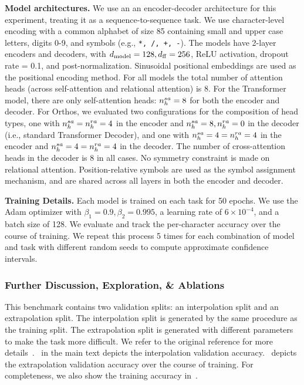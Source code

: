 \textbf{Model architectures.} We use an an encoder-decoder architecture for this experiment, treating it as a sequence-to-sequence task. We use character-level encoding with a common alphabet of size 85 containing small and upper case letters, digits 0-9, and symbols (e.g., \texttt{*, /, +, -}). The models have 2-layer encoders and decoders, with $d_{\mathrm{model}} = 128, d_{\mathrm{ff}} = 256$, ReLU activation, dropout rate = 0.1, and post-normalization. Sinusoidal positional embeddings are used as the positional encoding method. For all models the total number of attention heads (across self-attention and relational attention) is $8$. For the Transformer model, there are only self-attention heads: $n_h^{sa} = 8$ for both the encoder and decoder. For Orthos, we evaluated two configurations for the composition of head types, one with $n_h^{sa} = n_h^{ra} = 4$ in the encoder and $n_h^{sa} = 8, n_h^{ra} = 0$ in the decoder (i.e., standard Transformer Decoder), and one with $n_h^{sa} = 4 = n_h^{ra} = 4$ in the encoder and $n_h^{sa} = 4 = n_h^{ra} = 4$ in the decoder. The number of cross-attention heads in the decoder is $8$ in all cases. No symmetry constraint is made on relational attention. Position-relative symbols are used as the symbol assignment mechanism, and are shared across all layers in both the encoder and decoder.

\textbf{Training Details.} Each model is trained on each task for 50 epochs. We use the Adam optimizer with $\beta_1 = 0.9, \beta_2 = 0.995$, a learning rate of $6 \times 10^{-4}$, and a batch size of 128. We evaluate and track the per-character accuracy over the course of training. We repeat this process 5 times for each combination of model and task with different random seeds to compute approximate confidence intervals.

\subsubsection*{Further Discussion, Exploration, \& Ablations}

This benchmark contains two validation splits: an interpolation split and an extrapolation split. The interpolation split is generated by the same procedure as the training split. The extrapolation split is generated with different parameters to make the task more difficult. We refer to the original reference for more details~\citep{saxtonAnalyzingMathematicalReasoning2019}.~ in the main text depicts the interpolation validation accuracy.~ depicts the extrapolation validation accuracy over the course of training. For completeness, we also show the training accuracy in~.

